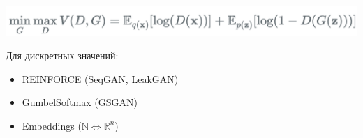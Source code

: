 \documentclass[10pt]{beamer}
\begin{document}
\begin{frame}
\begin{columns}
\begin{column}{0.65\textwidth}
\begin{center}
            \includegraphics[width=\textwidth]{images/gan_loss.png}\\
        \end{center}
        \vskip-1mm
        \setcounter{footnote}{0}
        Для дискретных значений\footnotemark:
        \begin{itemize}
            \item REINFORCE (SeqGAN, LeakGAN)
            \item GumbelSoftmax (GSGAN)
            \item Embeddings ($\mathbb{N} \Leftrightarrow \mathbb{R}^n$)
        \end{itemize}
    \end{column}
\end{columns}


\end{frame}
\end{document}
